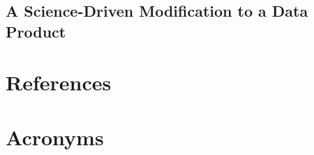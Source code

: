 \documentclass[DM,lsstdraft,authoryear,toc]{lsstdoc}
\begin{document}
\clearpage
\subsection{A Science-Driven Modification to a Data Product}


\appendix
\section{References} \label{sec:bib}
\renewcommand{\refname}{} %


\section{Acronyms} \label{sec:acronyms}

\end{document}

